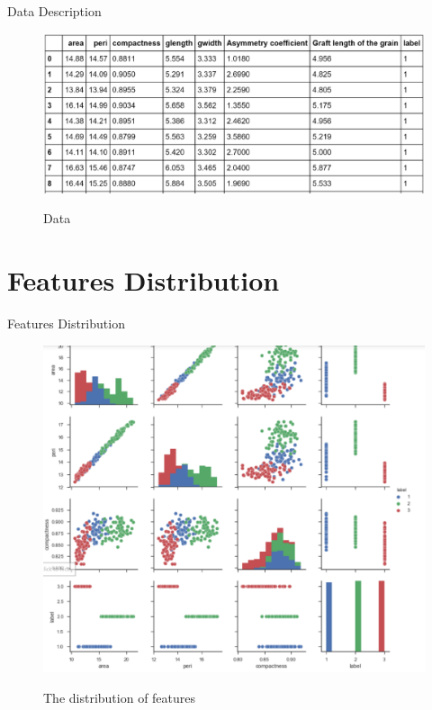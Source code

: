 \documentclass[
 size=12pt,
 paper=smartboard, %
 mode=present, %
 display=slides, %
 style=tuliplab,  %
 pauseslide,
 fleqn,leqno,clock]{powerdot}
\begin{document}
\begin{slide}{Data Description}

\begin{figure}
  \centering
  \includegraphics[width=7in]{Figures/1.eps}\\
  \caption{Data}
  \label{Data}
\end{figure}

\end{slide}

\section{Features Distribution}

\begin{slide}{Features Distribution}
\begin{figure}
  \centering
  \includegraphics[width=5in]{Figures/2.eps}\\
  \caption{The distribution of features}
  \label{The distribution of features}
\end{figure}
\end{slide}
\end{document}
